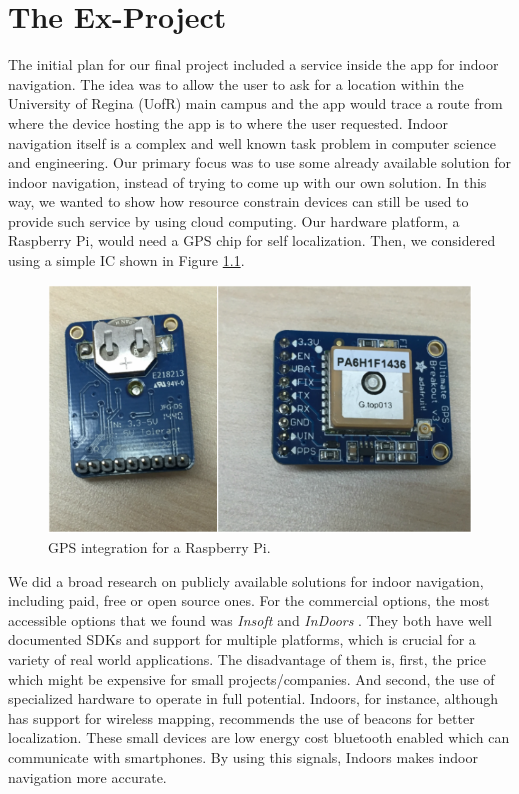 \chapter{The Ex-Project}
\label{sec:ex-project}



The initial plan for our final project included a service inside the app for indoor navigation.
The idea was to allow the user to ask for a location within the University of Regina (UofR) main campus and the app would trace a route from where the device hosting the app is to where the user requested.
Indoor navigation itself is a complex and well known task problem in computer science and engineering.
Our primary focus was to use some already available solution for indoor navigation, instead of trying to come up with our own solution.
In this way, we wanted to show how resource constrain devices can still be used to provide such service by using cloud computing.
Our hardware platform, a Raspberry Pi, would need a GPS chip for self localization.
Then, we considered using a simple IC shown in Figure \ref{fig:chip}.

\begin{figure}
\begin{center}
\includegraphics[width=\textwidth]{figures/chip_gps.png}
\caption{GPS integration for a Raspberry Pi.}
\label{fig:chip}
\end{center}
\end{figure}

We did a broad research on publicly available solutions for indoor navigation, including paid, free or open source ones.
For the commercial options, the most accessible options that we found was \emph{Insoft} \cite{insof16} and \emph{InDoors} \cite{indorsf16}.
They both have well documented SDKs and support for multiple platforms, which is crucial for a variety of real world applications.
The disadvantage of them is, first, the price which might be expensive for small projects/companies. And second, the use of specialized hardware to operate in full potential.
Indoors, for instance, although has support for wireless mapping, recommends the use of beacons for better localization.
These small devices are low energy cost bluetooth enabled which can communicate with smartphones.
By using this signals, Indoors makes indoor navigation more accurate.

